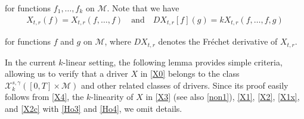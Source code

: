 \documentclass[letterpaper, 11pt,  reqno]{amsart}
\newcommand{\1}{\hspace{0.5mm}\text{I}\hspace{0.5mm}}
\newcommand{\noi}{\noindent}
\newcommand{\g}{\gamma}
\newcommand{\M}{\mathcal{M}}
\newcommand{\cX}{\mathcal{X}}
\numberwithin{equation}{section}
\numberwithin{theorem}{section}
\begin{document}
\noi
for functions $f_1, \dots, f_k$ on $\M$.
Note that we have 
\begin{align}
X_{t, r}(f) = X_{t, r}(f, \dots, f)
\quad \text{and}\quad
DX_{t, r}[f] (g) = k X_{t, r}(f, \dots, f, g)
\label{X4}
\end{align}


\noi
for functions $f$ and $g$ on $\M$, 
where $DX_{t, r}$ denotes the  Fr\'echet derivative of $X_{t, r}$.



\medskip







In the current $k$-linear setting, 
the following lemma
provides  simple criteria, 
allowing us to  verify that 
a driver $X$ in \eqref{X0} belongs to 
the class
 $\cX^{s, \g}_k([0, T]\times \M)$
and other related classes of drivers.
Since its proof easily follows
 from 
 \eqref{X4}, 
 the $k$-linearity of $X$ in \eqref{X3}
 (see also \eqref{non1}), 
  \eqref{X1}, \eqref{X2}, \eqref{X1x}, and \eqref{X2c}
with 
\eqref{Ho3} and \eqref{Ho4}, 
 we omit details.
\end{document}
